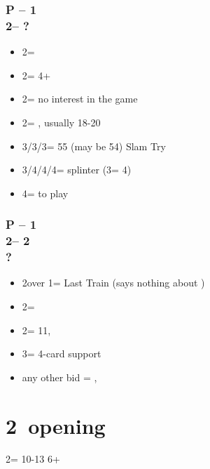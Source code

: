 \documentclass[12pt, a4paper]{report}
\begin{document}
{{{            \subsubsection*{P -- 1\spades \\ 2\clubs -- ?}
            \begin{itemize}
                \item 2\diams = \inv
                \item 2\hearts = 4+\hearts\ \invp
                \item 2\spades = no interest in the game
                \item 2\nt = \ahsf, usually 18-20 \bal
                \item 3\clubs/3\diams/3\hearts = 55 (may be 54) Slam Try
                \item 3\nt/4\clubs/4\diams/4\hearts = splinter (3\nt = 4\hearts)
                \item 4\spades = to play
            \end{itemize}

            \subsubsection*{P -- 1\major \\ 2\clubs -- 2\diams \\ ?}
            \begin{itemize}
                \item 2\hearts over 1\spades = Last Train (says nothing about \hearts)
                \item 2\major = \soff
                \item 2\nt = 11, \bal
                \item 3\major = 4-card support
                \item any other bid = \nat, \inv
            \end{itemize}
        }

        \section*{\colorbox{blue!30}{2\hearts\ opening}}
         {

            2\hearts = 10-13 6+\hearts

}}}
\end{document}
